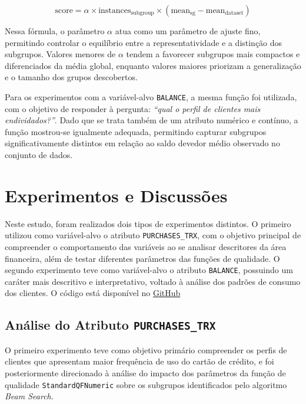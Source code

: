 \documentclass[12pt]{article}
\begin{document}
\begin{equation}
\text{score} = \alpha \times \text{instances}_{\text{subgroup}} \times (\text{mean}_{\text{sg}} - \text{mean}_{\text{dataset}})
\end{equation}

Nessa fórmula, o parâmetro $\alpha$ atua como um parâmetro de ajuste fino, permitindo controlar o equilíbrio entre a representatividade e a distinção dos subgrupos. Valores menores de $\alpha$ tendem a favorecer subgrupos mais compactos e diferenciados da média global, enquanto valores maiores priorizam a generalização e o tamanho dos grupos descobertos.

Para os experimentos com a variável-alvo \texttt{BALANCE}, a mesma função foi utilizada, com o objetivo de responder à pergunta: \textit{“qual o perfil de clientes mais endividados?”}. Dado que se trata também de um atributo numérico e contínuo, a função mostrou-se igualmente adequada, permitindo capturar subgrupos significativamente distintos em relação ao saldo devedor médio observado no conjunto de dados.

\section{Experimentos e Discussões}

\hspace{1.2cm}Neste estudo, foram realizados dois tipos de experimentos distintos. O primeiro utilizou como variável-alvo o atributo \texttt{PURCHASES\_TRX}, com o objetivo principal de compreender o comportamento das variáveis ao se analisar descritores da área financeira, além de testar diferentes parâmetros das funções de qualidade. O segundo experimento teve como variável-alvo o atributo \texttt{BALANCE}, possuindo um caráter mais descritivo e interpretativo, voltado à análise dos padrões de consumo dos clientes. O código está disponível no \href{https://github.com/larissantana27/AprendizadoDescritivo}{GitHub}

\subsection{Análise do Atributo \texttt{PURCHASES\_TRX}}

\hspace{1.2cm}O primeiro experimento teve como objetivo primário compreender os perfis de clientes que apresentam maior frequência de uso do cartão de crédito, e foi posteriormente direcionado à análise do impacto dos parâmetros da função de qualidade \texttt{StandardQFNumeric} sobre os subgrupos identificados pelo algoritmo \textit{Beam Search}.
\end{document}
